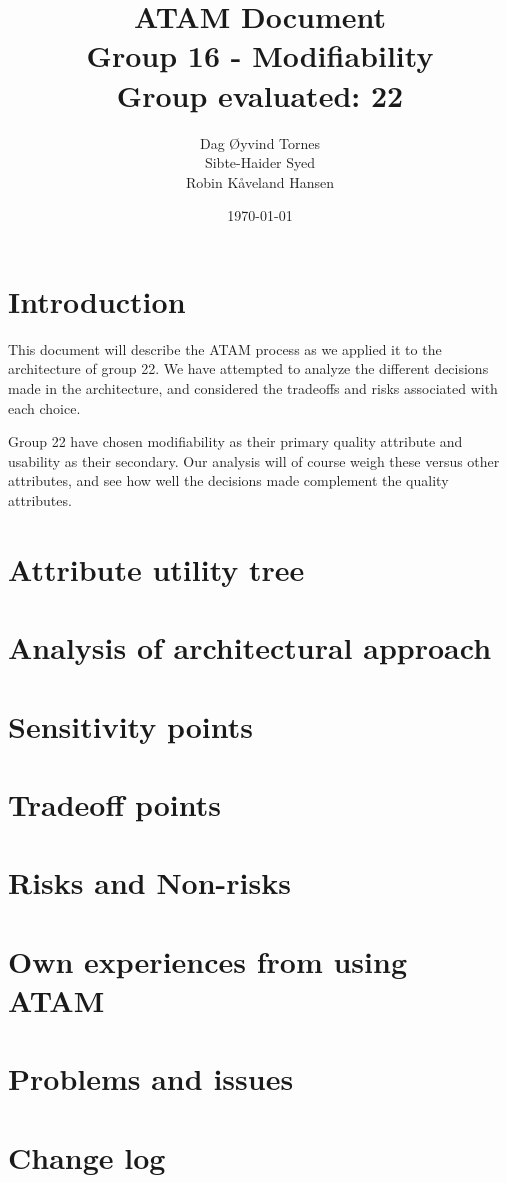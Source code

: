 \documentclass[titlepage,a4paper,10pt]{article}
\date{\today}
\begin{document}
\title{ATAM Document\\
 	   Group 16 - Modifiability\\
 	   Group evaluated: 22}

\author{Dag Øyvind Tornes\\
 		Sibte-Haider Syed\\ 
		Robin Kåveland Hansen\\}
\maketitle

\pagestyle{empty}
\tableofcontents
\clearpage
\pagestyle{plain}

\section{Introduction}
This document will describe the ATAM process as we applied it to the
architecture of group 22. We have attempted to analyze the different
decisions made in the architecture, and considered the tradeoffs and
risks associated with each choice.

Group 22 have chosen modifiability as their primary quality attribute
and usability as their secondary.  Our analysis will of course weigh
these versus other attributes, and see how well the decisions made
complement the quality attributes.

\section{Attribute utility tree}


\section{Analysis of architectural approach}


\section{Sensitivity points}


\section{Tradeoff points}


\section{Risks and Non-risks}


\section{Own experiences from using ATAM}


\section{Problems and issues}


\section{Change log}

\end{document}
